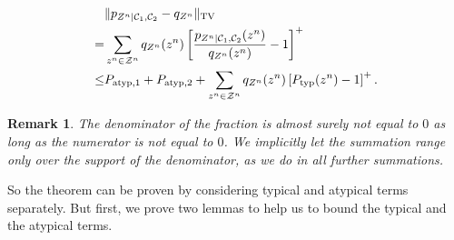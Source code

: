 \documentclass[journal]{IEEEtran}
\newcommand{\channelpmf}{q}
\newcommand{\codebookpmf}{p}
\newcommand{\channelOut}{Z}
\newcommand{\channelOutAlph}{\mathcal{Z}}
\newcommand{\channelOutAlphElement}{z}
\newcommand{\codebookOne}{\mathcal{C}_1}
\newcommand{\codebookTwo}{\mathcal{C}_2}
\newcommand{\codebookBlocklength}{n}
\newcommand{\totalvariation}[1]{\lVert #1 \rVert_\mathrm{TV}}
\newcommand{\positive}[1]{\left[ #1 \right]^+}
\newcommand{\totvarAtypicalOne}{P_{\mathrm{atyp}, 1}}
\newcommand{\totvarAtypicalTwo}{P_{\mathrm{atyp}, 2}}
\newcommand{\totvarTypical}[1]{P_{\mathrm{typ}}({#1})}
\newtheorem{remark}{Remark}
\begin{document}
\begin{align}
\notag
&\totalvariation{ \codebookpmf_{\channelOut^\codebookBlocklength | \codebookOne, \codebookTwo} - \channelpmf_{\channelOut^\codebookBlocklength}}
\\
\notag
=
&\sum\limits_{\channelOutAlphElement^\codebookBlocklength \in \channelOutAlph^\codebookBlocklength}
  \channelpmf_{\channelOut^\codebookBlocklength}(\channelOutAlphElement^\codebookBlocklength)
  \positive{\frac{\codebookpmf_{\channelOut^\codebookBlocklength | \codebookOne, \codebookTwo}(\channelOutAlphElement^\codebookBlocklength)}
                 {\channelpmf_{\channelOut^\codebookBlocklength}(\channelOutAlphElement^\codebookBlocklength)}
  - 1
  }
\\
\label{proof:soft-covering-two-transmitters-typical-split}
\leq
&\totvarAtypicalOne + \totvarAtypicalTwo
+
\sum\limits_{\channelOutAlphElement^\codebookBlocklength \in \channelOutAlph^\codebookBlocklength}
\channelpmf_{\channelOut^\codebookBlocklength}(\channelOutAlphElement^\codebookBlocklength)
\positive{\totvarTypical{\channelOutAlphElement^\codebookBlocklength} - 1}.
\end{align}

\begin{remark}
The denominator of the fraction is almost surely not equal to $0$ as long as the numerator is not equal to $0$. We implicitly let the summation range only over the support of the denominator, as we do in all further summations.
\end{remark}

So the theorem can be proven by considering typical and atypical terms separately.
But first, we prove two lemmas to help us to bound the typical and the atypical terms.
\end{document}
